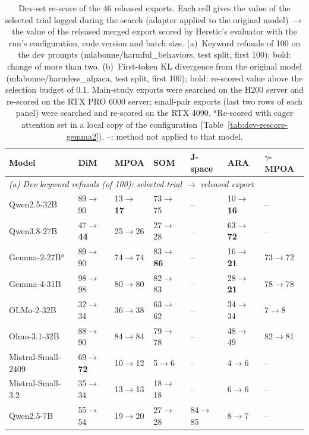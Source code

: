 \begin{table}[t]
\centering\scriptsize
\setlength{\tabcolsep}{3pt}
\caption{Dev-set re-score of the 46 released exports. Each cell gives the
value of the selected trial logged during the search (adapter applied to the
original model) $\to$ the value of the released merged export scored by
Heretic's evaluator with the run's configuration, code version and batch size.
(a)~Keyword refusals of 100 on the dev prompts (mlabonne/harmful\_behaviors,
test split, first 100); bold: change of more than two. (b)~First-token KL
divergence from the original model (mlabonne/harmless\_alpaca, test split,
first 100); bold: re-scored value above the selection budget of 0.1. Main-study
exports were searched on the H200 server and re-scored on the RTX PRO 6000
server; small-pair exports (last two rows of each panel) were searched and
re-scored on the RTX 4090. $^{a}$Re-scored with eager attention set in a local
copy of the configuration (Table~\ref{tab:dev-rescore-gemma2}). --: method not
applied to that model.}
\label{tab:dev-rescore}
\begin{tabular}{lllllll}
\toprule
Model & DiM & MPOA & SOM & J-space & ARA & $\gamma$-MPOA \\
\midrule
\multicolumn{7}{l}{\emph{(a) Dev keyword refusals (of 100): selected trial $\to$ released export}} \\
\addlinespace[2pt]
Qwen2.5-32B & 89$\to$90 & 13$\to$\textbf{17} & 73$\to$75 & -- & 10$\to$\textbf{16} & -- \\
Qwen3.8-27B & 47$\to$\textbf{44} & 25$\to$26 & 27$\to$28 & -- & 63$\to$\textbf{72} & -- \\
\addlinespace[2pt]
Gemma-2-27B$^{a}$ & 89$\to$90 & 74$\to$74 & 83$\to$\textbf{86} & -- & 16$\to$\textbf{21} & 73$\to$72 \\
Gemma-4-31B & 98$\to$98 & 80$\to$80 & 82$\to$83 & -- & 28$\to$\textbf{21} & 78$\to$78 \\
\addlinespace[2pt]
OLMo-2-32B & 32$\to$34 & 36$\to$38 & 63$\to$62 & -- & 34$\to$34 & 7$\to$8 \\
Olmo-3.1-32B & 88$\to$90 & 84$\to$84 & 79$\to$78 & -- & 48$\to$49 & 82$\to$81 \\
\addlinespace[2pt]
Mistral-Small-2409 & 69$\to$\textbf{72} & 10$\to$12 & 5$\to$6 & -- & 4$\to$6 & -- \\
Mistral-Small-3.2 & 35$\to$34 & 13$\to$13 & 18$\to$18 & -- & 6$\to$6 & -- \\
\addlinespace[2pt]
Qwen2.5-7B & 55$\to$54 & 19$\to$20 & 27$\to$28 & 84$\to$85 & 8$\to$7 & -- \\

\end{tabular}
\end{table}
